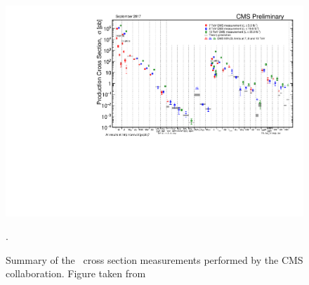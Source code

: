 \begin{figure}[htbp]
	\centering
	\includegraphics[width=1.\linewidth]{1_Introduction/Figures/SigmaNew_v0}
	\caption{Summary of the \SM\ cross section measurements performed by the CMS collaboration. Figure taken from \cite{summarywiki}}.
	\label{fig:sigmanewv0}
\end{figure}


